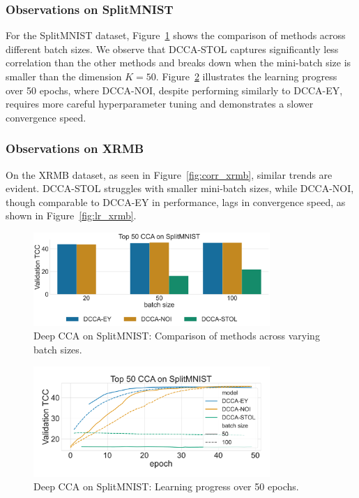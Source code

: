 \subsubsection{Observations on SplitMNIST}
For the SplitMNIST dataset, Figure~\ref{fig:corr_mnist} shows the comparison of methods across different batch sizes.
We observe that DCCA-STOL captures significantly less correlation than the other methods and breaks down when the mini-batch size is smaller than the dimension $K=50$.
Figure~\ref{fig:lr_mnist} illustrates the learning progress over 50 epochs, where DCCA-NOI, despite performing similarly to DCCA-EY, requires more careful hyperparameter tuning and demonstrates a slower convergence speed.

\subsubsection{Observations on XRMB}
On the XRMB dataset, as seen in Figure~\ref{fig:corr_xrmb}, similar trends are evident.
DCCA-STOL struggles with smaller mini-batch sizes, while DCCA-NOI, though comparable to DCCA-EY in performance, lags in convergence speed, as shown in Figure~\ref{fig:lr_xrmb}.

\begin{figure}
    \centering
    \includegraphics[width=0.8\textwidth]{figures/DCCA/SplitMNIST_models_different_batch_sizes}
    \caption{Deep CCA on SplitMNIST: Comparison of methods across varying batch sizes.}
    \label{fig:corr_mnist}
\end{figure}

\begin{figure}
    \centering
    \includegraphics[width=0.8\textwidth]{figures/DCCA/SplitMNIST_allbatchsizes_pcc}
    \caption{Deep CCA on SplitMNIST: Learning progress over 50 epochs.}
    \label{fig:lr_mnist}
\end{figure}

